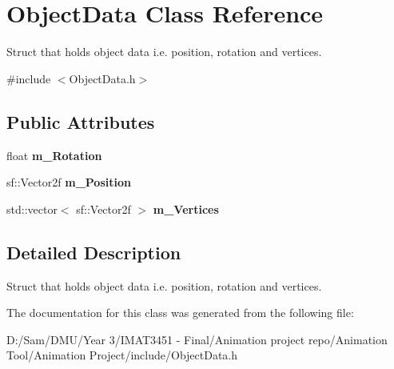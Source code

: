 \hypertarget{class_object_data}{}\section{Object\+Data Class Reference}
\label{class_object_data}


Struct that holds object data i.\+e. position, rotation and vertices.  




{\ttfamily \#include $<$Object\+Data.\+h$>$}

\subsection*{Public Attributes}
\begin{DoxyCompactItemize}
\item 
\mbox{\label{class_object_data_a3c0fcd774b50938d0b4c693f08437c29}} 
float {\bfseries m\+\_\+\+Rotation}
\item 
\mbox{\label{class_object_data_aaf6c38e34f3ebfab203c06e44b870011}} 
sf\+::\+Vector2f {\bfseries m\+\_\+\+Position}
\item 
\mbox{\label{class_object_data_aaec2ade9eff5eea0c57c6b2165f42a0e}} 
std\+::vector$<$ sf\+::\+Vector2f $>$ {\bfseries m\+\_\+\+Vertices}
\end{DoxyCompactItemize}


\subsection{Detailed Description}
Struct that holds object data i.\+e. position, rotation and vertices. 

The documentation for this class was generated from the following file\+:\begin{DoxyCompactItemize}
\item 
D\+:/\+Sam/\+D\+M\+U/\+Year 3/\+I\+M\+A\+T3451 -\/ Final/\+Animation project repo/\+Animation Tool/\+Animation Project/include/Object\+Data.\+h\end{DoxyCompactItemize}
